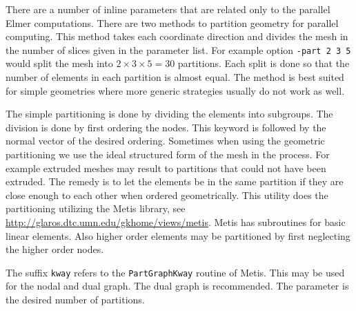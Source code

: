 There are a number of inline parameters that are related only to the parallel Elmer computations.
%
\sifbegin
{} 
There are two methods to partition geometry for parallel computing. This
method takes each coordinate direction and divides the mesh in the number
of slices given in the parameter list. For example option
\texttt{-part 2 3 5} would split the mesh into $2\times 3 \times 5 = 30$ partitions. 
Each split is done so that the number of elements in each partition
is almost equal. The method is best suited for simple geometries 
where more generic strategies usually do not work as well.



%
The simple partitioning is done by dividing the elements
into subgroups. The division is done by first ordering the nodes. This
keyword is followed by the normal vector of the desired ordering.
%
Sometimes when using the geometric partitioning we use the ideal
structured form of the mesh in the process. For example extruded meshes
may result to partitions that could not have been extruded. The remedy
is to let the elements be in the same partition if they are close enough
to each other when ordered geometrically.
%
This utility does the partitioning utilizing the Metis library, see
\url{http://glaros.dtc.umn.edu/gkhome/views/metis}. Metis has subroutines
for basic linear elements. Also higher order elements may be partitioned
by first neglecting the higher order nodes.

The suffix \texttt{kway} refers to the \texttt{PartGraphKway} routine of Metis. 
This may be used for the nodal and dual graph. The dual graph is recommended. 
The parameter is the desired number of partitions. 

